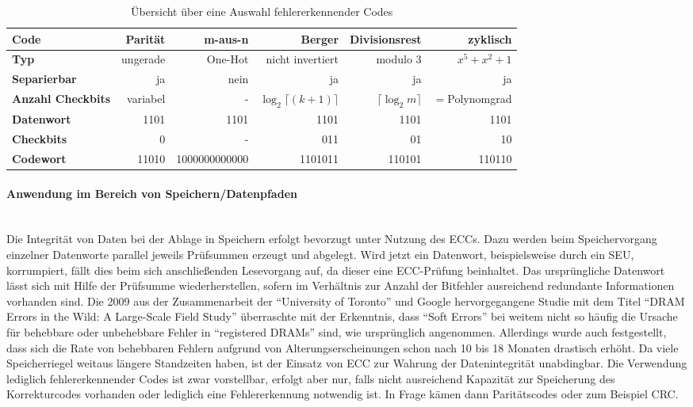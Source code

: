 \begin{table*}[htbp]
  \centering
  \footnotesize
  \caption{Übersicht über eine Auswahl fehlererkennender Codes}
  \vspace{0.5cm}
  \begin{tabular}{@{}p{2.2cm} r r r r r@{}}
    \toprule
    \textbf{Code} & Parität & m-aus-n & Berger & Divisionsrest &
    zyklisch \\
    \midrule
    \textbf{Typ} & ungerade & One-Hot & nicht invertiert &
    modulo 3 & $x^5+x^2+1$\\
    \midrule
    \textbf{Separierbar} & ja & nein & ja & ja & ja \\
    \textbf{Anzahl Checkbits} & variabel & - & $\log_2\lceil(k+1)\rceil$
    & $\lceil \log_2m \rceil$ & $=$Polynomgrad\\
    \midrule
    \textbf{Datenwort} & 1101 & 1101 & 1101 & 1101 & 1101 \\
    \textbf{Checkbits} & 0 & - & 011 & 01 & 10 \\
    \textbf{Codewort} & 11010 & 1000000000000 & 1101011& 110101 & 110110 \\
    \bottomrule
  \end{tabular}
  \label{tab:grundlagen_gegenmassnahmen_codes}
\end{table*}


\paragraph{Anwendung im Bereich von Speichern/Datenpfaden}\hspace{0cm}\\
Die Integrität von Daten bei der Ablage in Speichern erfolgt bevorzugt
unter Nutzung des ECCs. Dazu werden beim Speichervorgang einzelner
Datenworte parallel jeweils Prüfsummen erzeugt und abgelegt. Wird
jetzt ein Datenwort, beispielsweise durch ein SEU, korrumpiert, fällt
dies beim sich anschließenden Lesevorgang auf, da dieser eine
ECC-Prüfung beinhaltet. Das ursprüngliche Datenwort lässt sich mit
Hilfe der Prüfsumme wiederherstellen, sofern im Verhältnis zur Anzahl
der Bitfehler ausreichend redundante Informationen vorhanden
sind. Die 2009 aus der Zusammenarbeit der ``University of Toronto''
und Google hervorgegangene Studie mit dem Titel ``DRAM Errors in the
Wild: A Large-Scale Field Study'' \cite{schroeder09} überraschte mit
der Erkenntnis, dass ``Soft Errors'' bei weitem nicht so häufig die
Ursache für behebbare oder unbehebbare Fehler in ``registered DRAMs''
sind, wie ursprünglich angenommen. Allerdings wurde auch festgestellt,
dass sich die Rate von behebbaren Fehlern aufgrund von
Alterungserscheinungen schon nach 10 bis 18 Monaten drastisch
erhöht. Da viele Speicherriegel weitaus längere Standzeiten haben, ist
der Einsatz von ECC zur Wahrung der Datenintegrität unabdingbar. Die
Verwendung lediglich fehlererkennender Codes ist zwar vorstellbar,
erfolgt aber nur, falls nicht ausreichend Kapazität zur Speicherung
des Korrekturcodes vorhanden oder lediglich eine Fehlererkennung
notwendig ist. In Frage kämen dann Paritätscodes oder zum Beispiel CRC.

